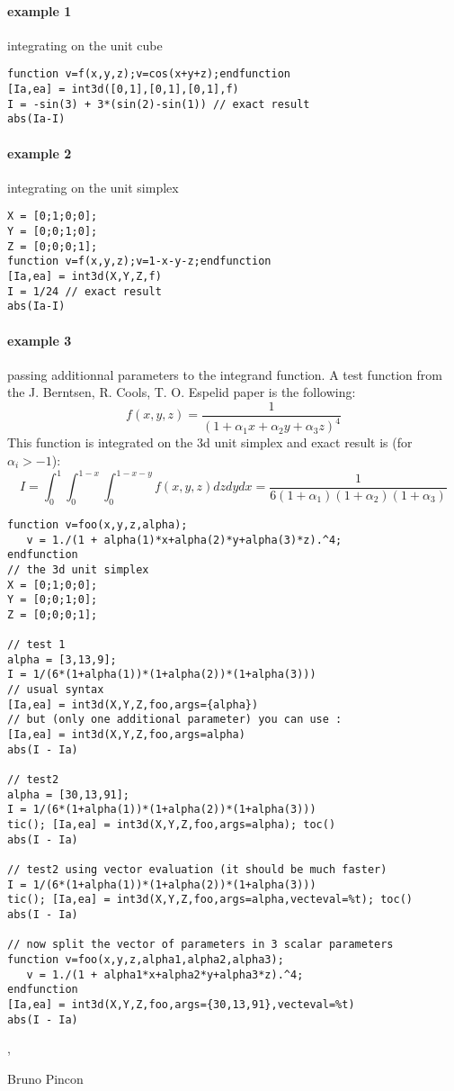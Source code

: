 \begin{examples}
  
\paragraph{example 1} integrating on the unit cube 
\begin{Verbatim}
function v=f(x,y,z);v=cos(x+y+z);endfunction
[Ia,ea] = int3d([0,1],[0,1],[0,1],f)
I = -sin(3) + 3*(sin(2)-sin(1)) // exact result  
abs(Ia-I)
\end{Verbatim}
  
\paragraph{example 2} integrating on the unit simplex
\begin{Verbatim}
X = [0;1;0;0];
Y = [0;0;1;0];
Z = [0;0;0;1];
function v=f(x,y,z);v=1-x-y-z;endfunction
[Ia,ea] = int3d(X,Y,Z,f)
I = 1/24 // exact result  
abs(Ia-I)
\end{Verbatim}
  
\paragraph{example 3} passing additionnal parameters to the integrand function.
A test function from the J. Berntsen, R. Cools, T. O. Espelid paper is the
following:
$$
 f(x,y,z) = \frac{1}{(1 + \alpha_1 x +  \alpha_2 y +  \alpha_3 z)^4 } 
$$
This function is integrated on the 3d unit simplex and exact result is (for $\alpha_i > -1$):
$$
I = \int_0^1 \int_0^{1-x} \int_0^{1-x-y} f(x,y,z) dz dy dx = \frac{1}{6 (1+\alpha_1)(1+\alpha_2)(1+\alpha_3)}
$$
\begin{Verbatim}
function v=foo(x,y,z,alpha);
   v = 1./(1 + alpha(1)*x+alpha(2)*y+alpha(3)*z).^4;
endfunction
// the 3d unit simplex
X = [0;1;0;0];
Y = [0;0;1;0];
Z = [0;0;0;1];

// test 1
alpha = [3,13,9];
I = 1/(6*(1+alpha(1))*(1+alpha(2))*(1+alpha(3)))
// usual syntax 
[Ia,ea] = int3d(X,Y,Z,foo,args={alpha})
// but (only one additional parameter) you can use :
[Ia,ea] = int3d(X,Y,Z,foo,args=alpha)
abs(I - Ia)

// test2
alpha = [30,13,91];
I = 1/(6*(1+alpha(1))*(1+alpha(2))*(1+alpha(3)))
tic(); [Ia,ea] = int3d(X,Y,Z,foo,args=alpha); toc()
abs(I - Ia)

// test2 using vector evaluation (it should be much faster)
I = 1/(6*(1+alpha(1))*(1+alpha(2))*(1+alpha(3)))
tic(); [Ia,ea] = int3d(X,Y,Z,foo,args=alpha,vecteval=%t); toc()
abs(I - Ia)

// now split the vector of parameters in 3 scalar parameters
function v=foo(x,y,z,alpha1,alpha2,alpha3);
   v = 1./(1 + alpha1*x+alpha2*y+alpha3*z).^4;
endfunction
[Ia,ea] = int3d(X,Y,Z,foo,args={30,13,91},vecteval=%t)
abs(I - Ia)
\end{Verbatim}


\end{examples}

\begin{manseealso}
   ,    
\end{manseealso}

\begin{authors}
  Bruno Pincon
\end{authors}
